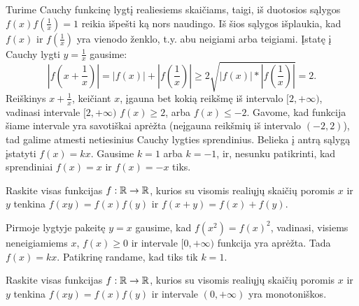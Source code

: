 \begin{sprendimas}
  Turime Cauchy funkcinę lygtį realiesiems skaičiams, taigi, iš duotosios
  sąlygos $f(x)f(\frac{1}{x})=1$ reikia išpešti ką nors naudingo. Iš šios
  sąlygos išplaukia, kad $f(x)$ ir $f(\frac{1}{x})$ yra vienodo ženklo, t.y.
  abu neigiami arba teigiami. Įstatę į Cauchy lygti $y=\frac{1}{x}$ gausime:
  $$|f(x+\frac{1}{x})|=|f(x)|+|f(\frac{1}{x})|\geq2\sqrt{|f(x)|*|f(\frac{1}{x})|}=2.$$
  Reiškinys $x+\frac{1}{x}$, keičiant $x$, įgauna bet kokią reikšmę iš
  intervalo $[2,+\infty)$, vadinasi intervale $[2,+\infty)$ $f(x)\geq2$, arba
  $f(x)\leq-2$. Gavome, kad funkcija šiame intervale yra savotiškai aprėžta
  (neįgauna reikšmių iš intervalo $(-2,2)$), tad galime atmesti netiesinius
  Cauchy lygties sprendinius. Belieka į antrą sąlygą įstatyti $f(x)=kx$.
  Gausime $k=1$ arba $k=-1$, ir, nesunku patikrinti, kad sprendiniai $f(x)=x$ ir
  $f(x)=-x$ tiks.
\end{sprendimas}

\begin{pavnr}
  Raskite visas funkcijas $f:\mathbb R\to\mathbb R$, kurios su visomis realiųjų skaičių
  poromis $x$ ir $y$ tenkina $f(xy)=f(x)f(y)$ ir $f(x+y)=f(x)+f(y).$
\end{pavnr}

\begin{sprendimas}
  Pirmoje lygtyje pakeitę $y=x$ gausime, kad $f(x^{2})=f(x)^{2}$, vadinasi,
  visiems neneigiamiems $x$, $f(x)\geq0$ ir intervale $[0,+\infty)$ funkcija
  yra aprėžta. Tada $f(x)=kx$. Patikrinę randame, kad tiks tik $k=1$.
\end{sprendimas}

\begin{pavnr}
  Raskite visas funkcijas $f:\mathbb R\to\mathbb R$, kurios su visomis realiųjų
  skaičių poromis $x$ ir $y$ tenkina $f(xy)=f(x)f(y)$ ir intervale
  $(0,+\infty)$ yra monotoniškos.
\end{pavnr}

